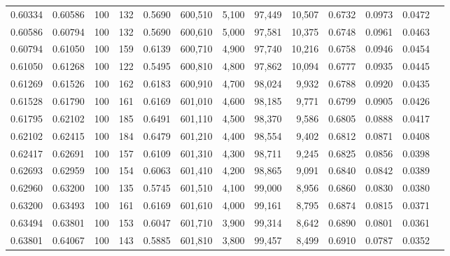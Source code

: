 \begin{tabular}{rrrrrrrrrrrrr}
0.60334 & 0.60586 &   100 & 132 &                                     0.5690 & 600,510 &   5,100 &  97,449 &  10,507 & 0.6732 & 0.0973 & 0.0472 \\
0.60586 & 0.60794 &   100 & 132 &                                     0.5690 & 600,610 &   5,000 &  97,581 &  10,375 & 0.6748 & 0.0961 & 0.0463 \\
0.60794 & 0.61050 &   100 & 159 &                                     0.6139 & 600,710 &   4,900 &  97,740 &  10,216 & 0.6758 & 0.0946 & 0.0454 \\
0.61050 & 0.61268 &   100 & 122 &                                     0.5495 & 600,810 &   4,800 &  97,862 &  10,094 & 0.6777 & 0.0935 & 0.0445 \\
0.61269 & 0.61526 &   100 & 162 &                                     0.6183 & 600,910 &   4,700 &  98,024 &   9,932 & 0.6788 & 0.0920 & 0.0435 \\
0.61528 & 0.61790 &   100 & 161 &                                     0.6169 & 601,010 &   4,600 &  98,185 &   9,771 & 0.6799 & 0.0905 & 0.0426 \\
0.61795 & 0.62102 &   100 & 185 &                                     0.6491 & 601,110 &   4,500 &  98,370 &   9,586 & 0.6805 & 0.0888 & 0.0417 \\
0.62102 & 0.62415 &   100 & 184 &                                     0.6479 & 601,210 &   4,400 &  98,554 &   9,402 & 0.6812 & 0.0871 & 0.0408 \\
0.62417 & 0.62691 &   100 & 157 &                                     0.6109 & 601,310 &   4,300 &  98,711 &   9,245 & 0.6825 & 0.0856 & 0.0398 \\
0.62693 & 0.62959 &   100 & 154 &                                     0.6063 & 601,410 &   4,200 &  98,865 &   9,091 & 0.6840 & 0.0842 & 0.0389 \\
0.62960 & 0.63200 &   100 & 135 &                                     0.5745 & 601,510 &   4,100 &  99,000 &   8,956 & 0.6860 & 0.0830 & 0.0380 \\
0.63200 & 0.63493 &   100 & 161 &                                     0.6169 & 601,610 &   4,000 &  99,161 &   8,795 & 0.6874 & 0.0815 & 0.0371 \\
0.63494 & 0.63801 &   100 & 153 &                                     0.6047 & 601,710 &   3,900 &  99,314 &   8,642 & 0.6890 & 0.0801 & 0.0361 \\
0.63801 & 0.64067 &   100 & 143 &                                     0.5885 & 601,810 &   3,800 &  99,457 &   8,499 & 0.6910 & 0.0787 & 0.0352 \\

\end{tabular}

